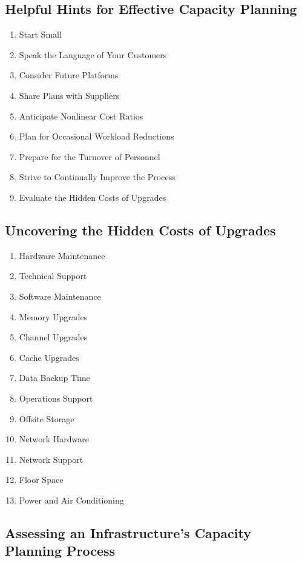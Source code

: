 \documentclass[a4]{article}
\begin{document}
\begin{multicols}{3}
\subsection{Helpful Hints for Effective Capacity Planning}
\begin{enumerate}
    \item Start Small
    \item Speak the Language of Your Customers
    \item Consider Future Platforms
    \item Share Plans with Suppliers
    \item Anticipate Nonlinear Cost Ratios
    \item Plan for Occasional Workload Reductions
    \item Prepare for the Turnover of Personnel
    \item Strive to Continually Improve the Process
    \item Evaluate the Hidden Costs of Upgrades
\end{enumerate}

\subsection{Uncovering the Hidden Costs of Upgrades}
\begin{enumerate}
    \item Hardware Maintenance
    \item Technical Support
    \item Software Maintenance
    \item Memory Upgrades
    \item Channel Upgrades
    \item Cache Upgrades
    \item Data Backup Time
    \item Operations Support
    \item Offsite Storage
    \item Network Hardware
    \item Network Support
    \item Floor Space
    \item Power and Air Conditioning
\end{enumerate}

\subsection{Assessing an Infrastructure’s Capacity Planning Process}

\end{multicols}
\end{document}
